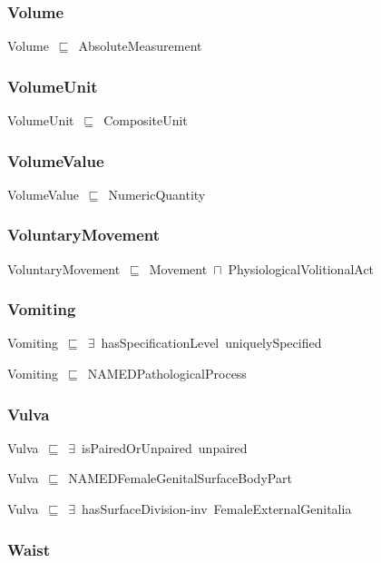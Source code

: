 \documentclass{article}
\begin{document}
\subsubsection*{Volume}

Volume~\ensuremath{\sqsubseteq}~AbsoluteMeasurement~

\subsubsection*{VolumeUnit}

VolumeUnit~\ensuremath{\sqsubseteq}~CompositeUnit~

\subsubsection*{VolumeValue}

VolumeValue~\ensuremath{\sqsubseteq}~NumericQuantity~

\subsubsection*{VoluntaryMovement}

VoluntaryMovement~\ensuremath{\sqsubseteq}~Movement~\ensuremath{\sqcap}~PhysiologicalVolitionalAct~

\subsubsection*{Vomiting}

Vomiting~\ensuremath{\sqsubseteq}~\ensuremath{\exists}~hasSpecificationLevel~uniquelySpecified~

Vomiting~\ensuremath{\sqsubseteq}~NAMEDPathologicalProcess~

\subsubsection*{Vulva}

Vulva~\ensuremath{\sqsubseteq}~\ensuremath{\exists}~isPairedOrUnpaired~unpaired~

Vulva~\ensuremath{\sqsubseteq}~NAMEDFemaleGenitalSurfaceBodyPart~

Vulva~\ensuremath{\sqsubseteq}~\ensuremath{\exists}~hasSurfaceDivision-inv~FemaleExternalGenitalia~

\subsubsection*{Waist}
\end{document}

